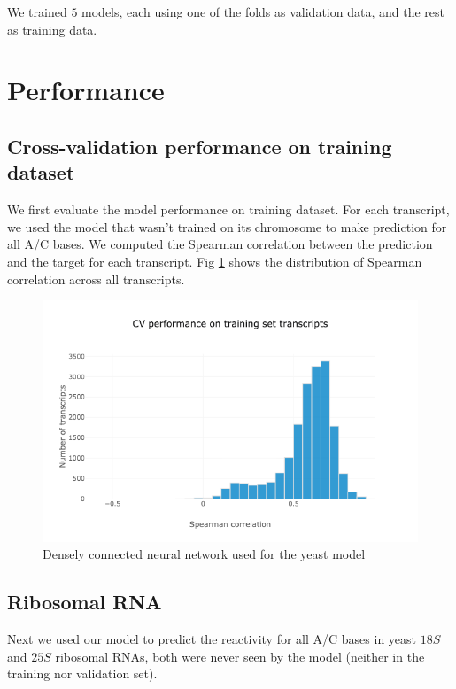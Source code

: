 \documentclass{proposal}
\begin{document}
We trained $5$ models, each using one of the folds as validation data, and the rest as training data.


\section{Performance}


\subsection{Cross-validation performance on training dataset}

We first evaluate the model performance on training dataset.
For each transcript, we used the model that wasn't trained on its chromosome to make prediction for all A/C bases.
We computed the Spearman correlation between the prediction and the target for each transcript.
Fig \ref{fig:yeast_cv_performance} shows the distribution of Spearman correlation across all transcripts.

\begin{figure}[h!]
\includegraphics[width=\textwidth]{yeast_cv_performance.png}
\caption{Densely connected neural network used for the yeast model}
\label{fig:yeast_cv_performance}
\centering
\end{figure}

\subsection{Ribosomal RNA}

Next we used our model to predict the reactivity for all A/C bases in yeast $18S$ and $25S$ ribosomal RNAs,
both were never seen by the model (neither in the training nor validation set).
\end{document}
